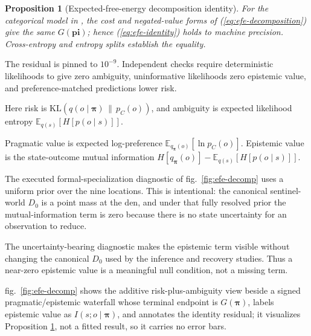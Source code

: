 \documentclass[
  english,
]{article}
\theoremstyle{plain}
\newtheorem{proposition}[theorem]{Proposition}
\theoremstyle{definition}
\theoremstyle{remark}
\theoremstyle{definition}
\begin{document}
\begin{proposition}[Expected-free-energy decomposition identity]\label{prop:efe-decomposition}
For the categorical model in , the cost and
negated-value forms of (\ref{eq:efe-decomposition}) give the same
$G(\boldsymbol{pi})$; hence (\ref{eq:efe-identity}) holds to machine precision.
Cross-entropy and entropy splits establish the equality.
\end{proposition}

The residual is pinned to \(10^{-9}\). Independent checks require
deterministic likelihoods to give zero ambiguity, uninformative
likelihoods zero epistemic value, and preference-matched predictions
lower risk.

Here risk is \(\mathrm{KL}(q(o\mid\boldsymbol{\pi})\,\|\,p_C(o))\), and
ambiguity is expected likelihood entropy
\(\mathbb{E}_{q(s)}[H[p(o\mid s)]]\).

Pragmatic value is expected log-preference
\(\mathbb{E}_{q_{\boldsymbol{\pi}}(o)}[\ln p_C(o)]\). Epistemic value is
the state-outcome mutual information
\(H[q_{\boldsymbol{\pi}}(o)] - \mathbb{E}_{q(s)}[H[p(o\mid s)]]\).

The executed formal-specialization diagnostic of
fig.~\ref{fig:efe-decomp} uses a uniform prior over the nine locations.
This is intentional: the canonical sentinel-world \(D_0\) is a point
mass at the den, and under that fully resolved prior the
mutual-information term is zero because there is no state uncertainty
for an observation to reduce.

The uncertainty-bearing diagnostic makes the epistemic term visible
without changing the canonical \(D_0\) used by the inference and
recovery studies. Thus a near-zero epistemic value is a meaningful null
condition, not a missing term.

fig.~\ref{fig:efe-decomp} shows the additive risk-plus-ambiguity view
beside a signed pragmatic/epistemic waterfall whose terminal endpoint is
\(G(\boldsymbol{\pi})\), labels epistemic value as
\(I(s;o\mid\boldsymbol{\pi})\), and annotates the identity residual; it
visualizes Proposition \ref{prop:efe-decomposition}, not a fitted
result, so it carries no error bars.
\end{document}
